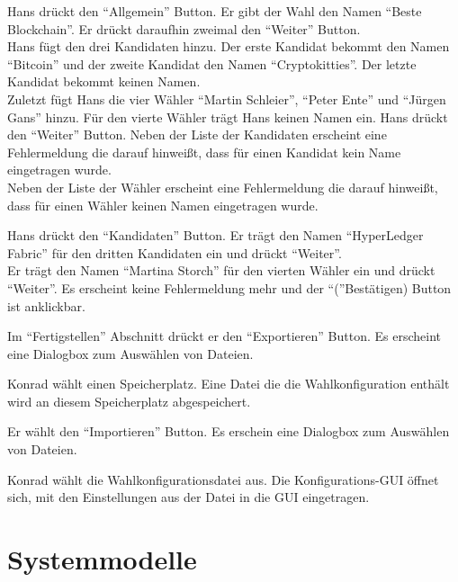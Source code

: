 \documentclass[parskip=full,11pt,twoside]{scrartcl}
\begin{document}
\teststep{}
		{Hans drückt den \enquote{Allgemein} Button. Er gibt der Wahl den Namen \enquote{Beste Blockchain}. Er drückt daraufhin zweimal den \enquote{Weiter} Button.\\
		Hans fügt den drei Kandidaten hinzu. Der erste Kandidat bekommt den Namen \enquote{Bitcoin} und der zweite Kandidat den Namen \enquote{Cryptokitties}. Der letzte Kandidat bekommt keinen Namen.\\
		Zuletzt fügt Hans die vier Wähler \enquote{Martin Schleier}, \enquote{Peter Ente} und \enquote{Jürgen Gans} hinzu. Für den vierte Wähler trägt Hans keinen Namen ein. Hans drückt den \enquote{Weiter} Button.}
		{Neben der Liste der Kandidaten erscheint eine Fehlermeldung die darauf hinweißt, dass für einen Kandidat kein Name eingetragen wurde.\\
		Neben der Liste der Wähler erscheint eine Fehlermeldung die darauf hinweißt, dass für einen Wähler keinen Namen eingetragen wurde.}
	
\teststep{}
		{Hans drückt den \enquote{Kandidaten} Button. Er trägt den Namen \enquote{HyperLedger Fabric} für den dritten Kandidaten ein und drückt \enquote{Weiter}.\\
		Er trägt den Namen \enquote{Martina Storch} für den vierten Wähler ein und drückt \enquote{Weiter}.}
		{Es erscheint keine Fehlermeldung mehr und der \enquote(Bestätigen) Button ist anklickbar.}


		{Im \enquote{Fertigstellen} Abschnitt drückt er den \enquote{Exportieren} Button.}
		{Es erscheint eine Dialogbox zum Auswählen von Dateien.}

\teststep{}
		{Konrad wählt einen Speicherplatz.}
		{Eine Datei die die Wahlkonfiguration enthält wird an diesem Speicherplatz abgespeichert.}

		{Er wählt den \enquote{Importieren} Button.}
		{Es erschein eine Dialogbox zum Auswählen von Dateien.}
		
\teststep{}
		{Konrad wählt die Wahlkonfigurationsdatei aus.}
		{Die Konfigurations-GUI öffnet sich, mit den Einstellungen aus der Datei in die GUI eingetragen.}

\section{Systemmodelle}
\end{document}
